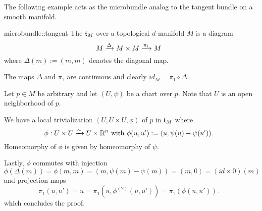 \begin{myparagraph}
    The following example acts as the microbundle analog to the tangent bundle on a smooth manifold.
\end{myparagraph}

\begin{myexample}{microbundle::tangent}
    The  $\mathfrak{t}_M$ over a topological $d$-manifold $M$ is a diagram
    \[ M \xrightarrow{\Delta} M \times M \xrightarrow{\pi_1} M{} \]
    where $\Delta(m) := (m, m)$ denotes the diagonal map.
\end{myexample}

\begin{myproof}
    The maps $\Delta$ and $\pi_1$ are continuous and clearly $id_M = \pi_1 \circ \Delta$.

    Let $p \in M$ be arbitrary and let $(U, \psi)$ be a chart over $p$.
    Note that $U$ is an open neighborhood of $p$.
    
    We have a local trivialization $(U, U \times U, \phi)$ of $p$ in $\mathfrak{t}_M$ where
    \[ \phi: U \times U \xrightarrow{\sim} U \times \mathbb{R}^n \text{ with } \phi(u, u') := (u, \psi(u) - \psi(u')). \]
    Homeomorphy of $\phi$ is given by homeomorphy of $\psi$.

    Lastly, $\phi$ commutes with injection
    \[ \phi(\Delta(m)) = \phi(m, m) = (m, \psi(m) - \psi(m)) = (m, 0) = (id \times 0)(m)\]
    and projection maps
    \[ \pi_1(u, u') = u = \pi_1(u, \phi^{(2)}(u, u')) = \pi_1(\phi(u, u')). \]
    which concludes the proof.
\end{myproof}